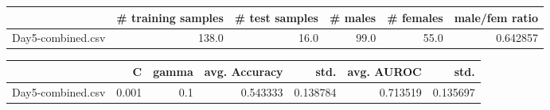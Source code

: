 \begin{tabular}{lrrrrr}
\hline
{} &  \# training samples &  \# test samples &  \# males &  \# females &  male/fem ratio \\
\hline
Day5-combined.csv &               138.0 &            16.0 &     99.0 &       55.0 &        0.642857 \\
\hline
\end{tabular}
\begin{tabular}{lrrrrrr}
\hline
{} &      C &  gamma &  avg. Accuracy &      std. &  avg. AUROC &      std. \\
\hline
Day5-combined.csv &  0.001 &    0.1 &       0.543333 &  0.138784 &    0.713519 &  0.135697 \\
\hline
\end{tabular}
